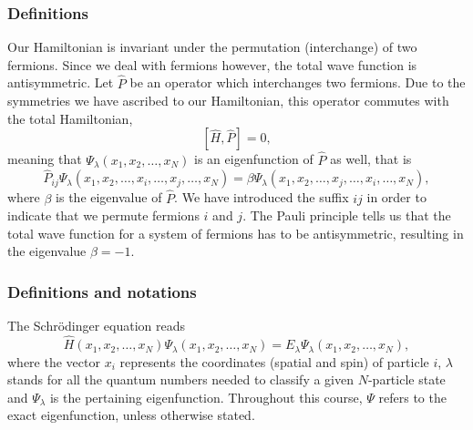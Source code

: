 \documentclass[compress]{beamer}
\begin{document}
\frame
{
\frametitle{Definitions}
Our Hamiltonian is invariant under the permutation (interchange) of two fermions.
Since we deal with fermions however, the total wave function is antisymmetric.
Let $\hat{P}$ be an operator which interchanges two fermions.
Due to the symmetries we have ascribed to our Hamiltonian, this operator commutes with the total Hamiltonian,
\[
[\hat{H},\hat{P}] = 0,
\]
meaning that $\Psi_{\lambda}(x_1, x_2, \dots , x_N)$ is an eigenfunction of 
$\hat{P}$ as well, that is
\[
\hat{P}_{ij}\Psi_{\lambda}(x_1, x_2, \dots,x_i,\dots,x_j,\dots,x_N)=
\beta\Psi_{\lambda}(x_1, x_2, \dots,x_j,\dots,x_i,\dots,x_N),
\]
where $\beta$ is the eigenvalue of $\hat{P}$. We have introduced the suffix $ij$ in order to indicate that we permute fermions $i$ and $j$.
The Pauli principle tells us that the total wave function for a system of fermions
has to be antisymmetric, resulting in the eigenvalue $\beta = -1$.   

}

\frame
{
  \frametitle{Definitions and notations}
\begin{small}
{\scriptsize
The Schr\"odinger equation reads 
\begin{equation}
\hat{H}(x_1, x_2, \dots , x_N) \Psi_{\lambda}(x_1, x_2, \dots , x_N) = 
E_\lambda  \Psi_\lambda(x_1, x_2, \dots , x_N), 
\label{eq:basicSE1}
\end{equation}
where the vector $x_i$ represents the coordinates (spatial and spin) of particle $i$, $\lambda$ stands  for all the quantum
numbers needed to classify a given $N$-particle  state and $\Psi_{\lambda}$ is the pertaining eigenfunction.  Throughout this course,
$\Psi$ refers to the exact eigenfunction, unless otherwise stated.
}
\end{small}
}
\end{document}
